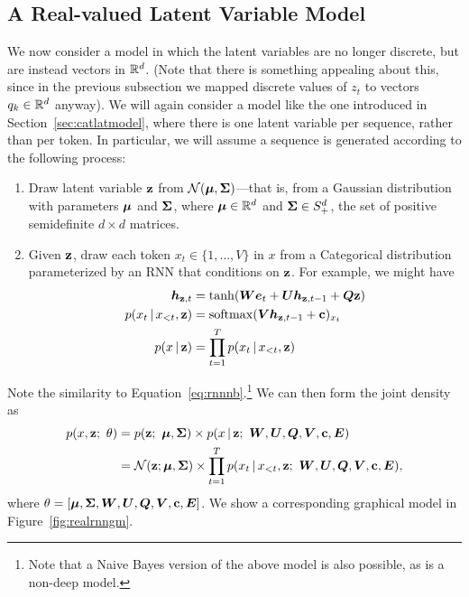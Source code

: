 \documentclass{article}
\begin{document}
\subsection{A Real-valued Latent Variable Model}\label{reallatent}
\label{sec:reallatmodel}
We now consider a model in which the latent variables are no longer discrete, but are instead vectors in $\mathbb{R}^d$. (Note that there is something appealing about this, since in the previous subsection we mapped discrete values of $z_t$ to vectors $q_k \in \mathbb{R}^d$ anyway). We will again consider a model like the one introduced in Section~\ref{sec:catlatmodel}, where there is one latent variable per sequence, rather than per token. In particular, we will assume a sequence is generated according to the following process:
\begin{enumerate}
    \item Draw latent variable $\mathbf{z}$ from $\mathcal{N}(\boldsymbol{\mu}, \boldsymbol{\Sigma})$---that is, from a Gaussian distribution with parameters $\boldsymbol{\mu}$ and $\boldsymbol{\Sigma}$, where $\boldsymbol{\mu} \in \mathbb{R}^d$ and $\boldsymbol{\Sigma} \in S^d_+$, the set of positive semidefinite $d \times d$ matrices.
    \item Given $\mathbf{z}$, draw each token $x_t \in \{1, \ldots, V\}$ in $x$ from a Categorical distribution parameterized by an RNN that conditions on $\mathbf{z}$. For example, we might have 
    \begin{align} \label{eq:realrnn}
\boldsymbol{h}_{\mathbf{z},t} &= \tanh(\boldsymbol{W} \boldsymbol{e}_t + \boldsymbol{U} \boldsymbol{h}_{\mathbf{z},t-1}  + \boldsymbol{Q} \mathbf{z}) \nonumber \\
p(x_{t} \,|\, x_{<t} , \mathbf{z}) &= \operatorname*{softmax}(\boldsymbol{V} \boldsymbol{h}_{\mathbf{z},t-1} + \mathbf{c})_{x_{t}} \nonumber \\
p(x \,|\, \mathbf{z}) &= \prod_{t=1}^{T} p(x_{t} \,|\, x_{<t} , \mathbf{z}) 
\end{align}
\end{enumerate}
Note the similarity to Equation~\eqref{eq:rnnnb}.\footnote{Note that a Naive Bayes version of the above model is also possible, as is a non-deep model.} We can then form the joint density as
\begin{align} \label{eq:realdensity}
 p(x, \mathbf{z} ; \ \theta) &= p(\mathbf{z}; \ \boldsymbol{\mu}, \boldsymbol{\Sigma}) \times p(x \,|\, \mathbf{z}; \ \boldsymbol{W}, \boldsymbol{U}, \boldsymbol{Q}, \boldsymbol{V}, \mathbf{c}, \boldsymbol{E}) \nonumber \\
 &= \mathcal{N}(\mathbf{z}; \boldsymbol{\mu}, \boldsymbol{\Sigma}) \times  \prod_{t=1}^T p(x_t \,|\, x_{<t}, \mathbf{z}; \ \boldsymbol{W}, \boldsymbol{U}, \boldsymbol{Q}, \boldsymbol{V}, \mathbf{c}, \boldsymbol{E}),
 \end{align}
where $\theta = [\boldsymbol{\mu}, \boldsymbol{\Sigma},\boldsymbol{W}, \boldsymbol{U}, \boldsymbol{Q}, \boldsymbol{V}, \mathbf{c}, \boldsymbol{E}]$. We show a corresponding graphical model in Figure~\ref{fig:realrnngm}.
\end{document}

